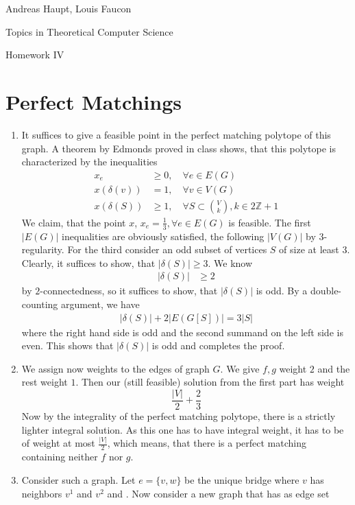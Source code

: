 \documentclass{scrartcl}
\newcommand\1{\mathbf{1}}
\begin{document}
Andreas Haupt, Louis Faucon

Topics in Theoretical Computer Science 

Homework IV


\section{Perfect Matchings}
\begin{enumerate}
\item
It suffices to give a feasible point in the perfect matching polytope of this graph. A theorem by Edmonds proved in class shows, that this polytope is characterized by the inequalities
\begin{align*}
x_e &\ge 0 , \quad \forall e \in E (G) \\
x(\delta (v)) &=1, \quad \forall v \in V(G) \\
x (\delta (S)) &\ge 1, \quad \forall S \subset \binom{V}{k}, k \in 2\mathbb{Z}+1
\end{align*}
We claim, that the point $x$, $x_e = \frac{1}{3}, \forall e \in E(G)$ is feasible. The first $\lvert E(G)\rvert$ inequalities are obviously satisfied, the following $\lvert V(G)\rvert$ by $3$-regularity. For the third consider an odd subset of vertices $S$ of size at least $3$. Clearly, it suffices to show, that $\lvert \delta (S) \rvert \ge 3$. We know
\begin{align*}
\lvert\delta (S)\rvert &\ge 2
\end{align*}
by $2$-connectedness, so it suffices to show, that $\lvert \delta (S) \rvert$ is odd. By a double-counting argument, we have
\begin{align*}
\lvert \delta (S) \rvert + 2\lvert E(G[S])\rvert = 3 \lvert S \rvert
\end{align*}
where the right hand side is odd and the second summand on the left side is even. This shows that $\lvert \delta (S) \rvert$ is odd and completes the proof.
\item
We assign now weights to the edges of graph $G$. We give $f,g$ weight $2$ and the rest weight $1$. Then our (still feasible) solution from the first part has weight
\[
\frac{\lvert V\rvert}{2} + \frac{2}{3}
\]
Now by the integrality of the perfect matching polytope, there is a strictly lighter integral solution. As this one has to have integral weight, it has to be of weight at most $\frac{\lvert V \rvert}{2}$, which means, that there is a perfect matching containing neither $f$ nor $g$.
\item
Consider such a graph. Let $e=\{v,w\}$ be the unique bridge where $v$ has neighbors $v^1$ and $v^2$ and . Now consider a new graph that has as edge set 

\end{enumerate}
\end{document}
